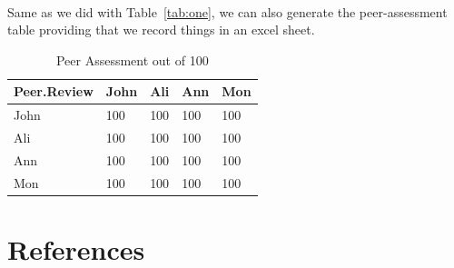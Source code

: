 \documentclass[10pt]{article}\usepackage[]{graphicx}\usepackage[]{color}
\begin{document}
\blindtext[2] \\

Same as we did with Table~\ref{tab:one}, we can also generate the peer-assessment table providing that we record things in an excel sheet. 

\begin{table}[ht]
\centering
\caption{Peer Assessment out of 100} 
\label{tab:two}
\begin{tabular}{lllll}
  \hline
Peer.Review & John & Ali & Ann & Mon \\ 
  \hline
John & 100 & 100 & 100 & 100 \\ 
  Ali & 100 & 100 & 100 & 100 \\ 
  Ann & 100 & 100 & 100 & 100 \\ 
  Mon & 100 & 100 & 100 & 100 \\ 
   \hline
\end{tabular}
\end{table}




\section*{References}\label{pubs}
\printbibliography[heading =none]
\end{document}
